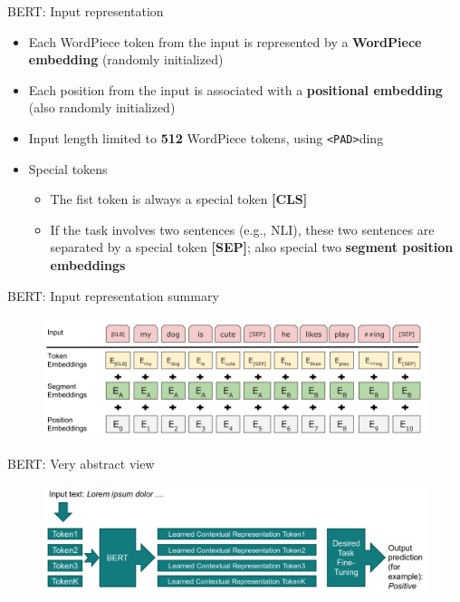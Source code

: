 \documentclass[12pt,aspectratio=169,handout]{beamer}
\begin{document}
\begin{frame}{BERT: Input representation}
	
	\begin{itemize}
		\item Each WordPiece token from the input is represented by a \textbf{WordPiece embedding} (randomly initialized)
		\item Each position from the input is associated with a \textbf{positional embedding} (also randomly initialized)
		\item Input length limited to \textbf{512} WordPiece tokens, using \texttt{<PAD>}ding
		\item Special tokens
		\begin{itemize}
			\item The fist token is always a special token \textbf{[CLS]}
			\item If the task involves two sentences (e.g., NLI), these two sentences are separated by a special token \textbf{[SEP]}; also special two \textbf{segment position embeddings} 
		\end{itemize}
		
	\end{itemize}
	
\end{frame}


\begin{frame}{BERT: Input representation summary}
	
	\begin{figure}
		\includegraphics[width=\linewidth]{img/bert-input.png}	
	\end{figure}
	
\end{frame}

\begin{frame}{BERT: Very abstract view}
	
	\begin{figure}
		\includegraphics[width=\linewidth]{img/bert1.png}
	\end{figure}	
	
\end{frame}
\end{document}
